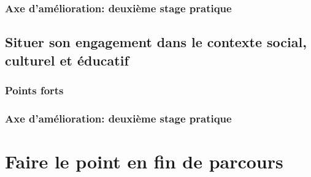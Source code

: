 \documentclass[titlepage,11pt,a4paper]{article}
\begin{document}
\subsubsection{Axe d'amélioration: deuxième stage pratique}

\subsection{Situer son engagement dans le contexte social, culturel et éducatif}
\subsubsection{Points forts}
\subsubsection{Axe d'amélioration: deuxième stage pratique}

\section{Faire le point en fin de parcours}
\end{document}
